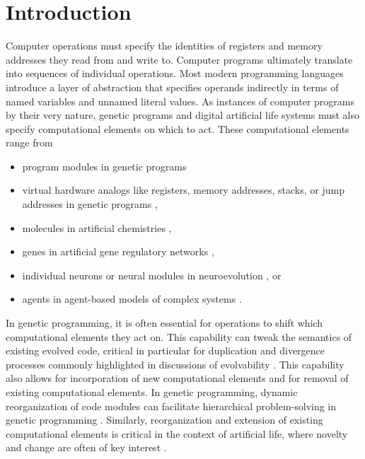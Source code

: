 \section{Introduction}

Computer operations must specify the identities of registers and memory addresses they read from and write to.
Computer programs ultimately translate into sequences of individual operations.
Most modern programming languages introduce a layer of abstraction that specifies operands indirectly in terms of named variables and unnamed literal values.
As instances of computer programs by their very nature, genetic programs and digital artificial life systems must also specify computational elements on which to act.
These computational elements range from
\begin{itemize}
  \item program modules in genetic programs \citep{spector2011tag}
  \item virtual hardware analogs like registers, memory addresses, stacks, or jump addresses in genetic programs \citep{lalejini_tag-accessed_2019,ray1991approach,ofria2004avida},
  \item molecules in artificial chemistries \citep{bagley1990spontaneous},
  \item genes in artificial gene regulatory networks \citep{banzhaf2003artificial},
  \item individual neurons or neural modules in neuroevolution \citep{reisinger2007acquiring}, or
  \item agents in agent-based models of complex systems \citep{riolo2001evolution}.
\end{itemize}

In genetic programming, it is often essential for operations to shift which computational elements they act on.
This capability can tweak the semantics of existing evolved code, critical in particular for duplication and divergence processes commonly highlighted in discussions of evolvability \citep{altenberg1994evolution}.
This capability also allows for incorporation of new computational elements and for removal of existing computational elements.
In genetic programming, dynamic reorganization of code modules can facilitate hierarchical problem-solving in genetic programming \citep{Kinnear:Koza:1994:adf}.
Similarly, reorganization and extension of existing computational elements is critical in the context of artificial life, where novelty and change are often of key interest \citep{taylor2016open}.

